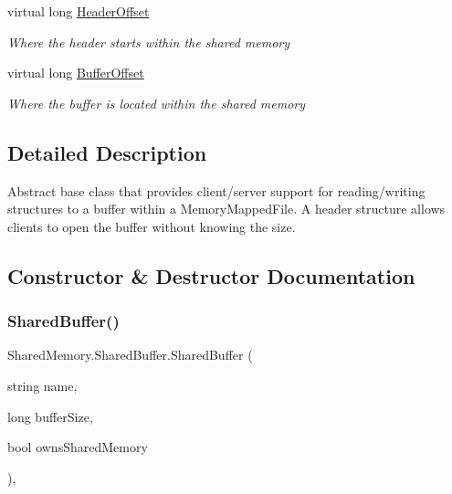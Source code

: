 \begin{DoxyCompactItemize}
virtual long \hyperlink{class_shared_memory_1_1_shared_buffer_a40517ed1660e6b9c72e0dd7c209325dc}{Header\+Offset}
\begin{DoxyCompactList}\small\item\em Where the header starts within the shared memory \end{DoxyCompactList}\item 
virtual long \hyperlink{class_shared_memory_1_1_shared_buffer_a0884f436845680ed51e78f972a434f19}{Buffer\+Offset}
\begin{DoxyCompactList}\small\item\em Where the buffer is located within the shared memory \end{DoxyCompactList}\end{DoxyCompactItemize}


\subsection{Detailed Description}
Abstract base class that provides client/server support for reading/writing structures to a buffer within a Memory\+Mapped\+File. A header structure allows clients to open the buffer without knowing the size. 



\subsection{Constructor \& Destructor Documentation}
\mbox{\label{class_shared_memory_1_1_shared_buffer_adc3066fb64b6f7cfa2b6b50d8cf53b78}} 
\subsubsection{\texorpdfstring{Shared\+Buffer()}{SharedBuffer()}}
{\footnotesize\ttfamily Shared\+Memory.\+Shared\+Buffer.\+Shared\+Buffer (\begin{DoxyParamCaption}\item[{string}]{name,  }\item[{long}]{buffer\+Size,  }\item[{bool}]{owns\+Shared\+Memory }\end{DoxyParamCaption})\hspace{0.3cm}{\ttfamily [inline]}, {\ttfamily [protected]}}



